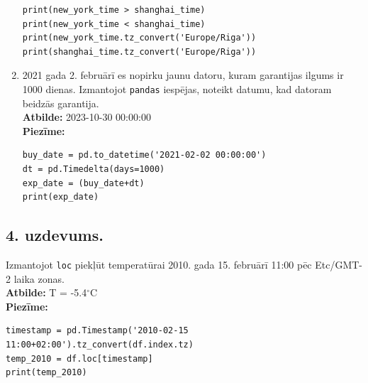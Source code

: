 \documentclass[12pt]{article}
\begin{document}
\begin{enumerate}
\begin{verbatim}
print(new_york_time > shanghai_time)
print(new_york_time < shanghai_time)
print(new_york_time.tz_convert('Europe/Riga'))
print(shanghai_time.tz_convert('Europe/Riga'))
        \end{verbatim}

        \item 2021 gada 2. februārī es nopirku jaunu datoru, kuram garantijas ilgums ir 1000 dienas. Izmantojot \texttt{pandas} iespējas, noteikt datumu, kad datoram beidzās garantija.\\
        \textbf{Atbilde:} 2023-10-30 00:00:00\\
        \textbf{Piezīme:} \begin{verbatim}
buy_date = pd.to_datetime('2021-02-02 00:00:00')
dt = pd.Timedelta(days=1000)
exp_date = (buy_date+dt)
print(exp_date)
        \end{verbatim}
    \end{enumerate}

\subsection*{4. uzdevums.} Izmantojot \texttt{loc} piekļūt temperatūrai 2010. gada 15. februārī 11:00 pēc Etc/GMT-2 laika zonas.\\

\noindent \textbf{Atbilde:} T = -5.4$^{\circ}$C\\

\noindent \textbf{Piezīme:}
\begin{verbatim}
timestamp = pd.Timestamp('2010-02-15 11:00+02:00').tz_convert(df.index.tz)
temp_2010 = df.loc[timestamp]
print(temp_2010)
\end{verbatim}
\end{document}
